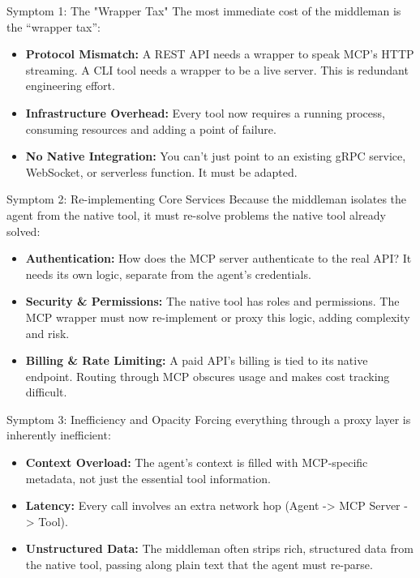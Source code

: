 \documentclass{beamer}
\begin{document}
\begin{frame}{Symptom 1: The "Wrapper Tax"}
  The most immediate cost of the middleman is the ``wrapper tax'':
  \begin{itemize}
    \item \textbf{Protocol Mismatch:} A REST API needs a wrapper to speak MCP's HTTP streaming. A CLI tool needs a wrapper to be a live server. This is redundant engineering effort.
    \item \textbf{Infrastructure Overhead:} Every tool now requires a running process, consuming resources and adding a point of failure.
    \item \textbf{No Native Integration:} You can't just point to an existing gRPC service, WebSocket, or serverless function. It must be adapted.
  \end{itemize}
\end{frame}

\begin{frame}{Symptom 2: Re-implementing Core Services}
  Because the middleman isolates the agent from the native tool, it must re-solve problems the native tool already solved:
  \begin{itemize}
    \item \textbf{Authentication:} How does the MCP server authenticate to the real API? It needs its own logic, separate from the agent's credentials.
    \item \textbf{Security & Permissions:} The native tool has roles and permissions. The MCP wrapper must now re-implement or proxy this logic, adding complexity and risk.
    \item \textbf{Billing & Rate Limiting:} A paid API's billing is tied to its native endpoint. Routing through MCP obscures usage and makes cost tracking difficult.
  \end{itemize}
\end{frame}

\begin{frame}{Symptom 3: Inefficiency and Opacity}
  Forcing everything through a proxy layer is inherently inefficient:
  \begin{itemize}
    \item \textbf{Context Overload:} The agent's context is filled with MCP-specific metadata, not just the essential tool information.
    \item \textbf{Latency:} Every call involves an extra network hop (Agent -> MCP Server -> Tool).
    \item \textbf{Unstructured Data:} The middleman often strips rich, structured data from the native tool, passing along plain text that the agent must re-parse.
  \end{itemize}
\end{frame}
\end{document}
